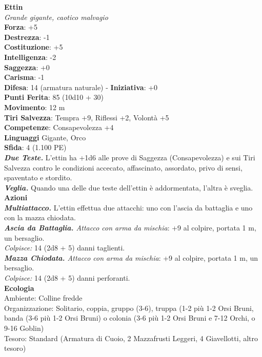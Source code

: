 \begin{multicols}{2}
\medskip\textbf{Ettin}\\
\emph{Grande gigante, caotico malvagio}\\
\textbf{Forza}: +5\\
\textbf{Destrezza}: -1\\
\textbf{Costituzione}: +5\\
\textbf{Intelligenza}: -2\\
\textbf{Saggezza}: +0\\
\textbf{Carisma}: -1\\
\textbf{Difesa}: 14 (armatura naturale) - \textbf{Iniziativa}: +0\\
\textbf{Punti Ferita}: 85 (10d10 + 30)\\
\textbf{Movimento}: 12 m\\
\textbf{Tiri Salvezza}: Tempra +9, Riflessi +2, Volontà +5\\
\textbf{Competenze}: Consapevolezza +4\\
\textbf{Linguaggi} Gigante, Orco\\
\textbf{Sfida}: 4 (1.100 PE)\smallskip\\
\emph{\textbf{Due Teste.}} L'ettin ha +1d6 alle prove di Saggezza (Consapevolezza) e sui Tiri Salvezza contro le condizioni accecato, affascinato, assordato, privo di sensi, spaventato e stordito. \\
\emph{\textbf{Veglia.}} Quando una delle due teste dell'ettin è addormentata, l'altra è sveglia.\\
\smallskip\textbf{Azioni} \\
\emph{\textbf{Multiattacco.}} L'ettin effettua due attacchi: uno con l'ascia da battaglia e uno con la mazza chiodata.\\
\emph{\textbf{Ascia da Battaglia.} Attacco con arma da mischia}: +9 al colpire, portata 1 m, un bersaglio.\\
\emph{Colpisce:} 14 (2d8 + 5) danni taglienti.\\
\emph{\textbf{Mazza Chiodata.} Attacco con arma da mischia}: +9 al colpire, portata 1 m, un bersaglio.\\
\emph{Colpisce:} 14 (2d8 + 5) danni perforanti.\\
\textbf{Ecologia}\\
Ambiente: Colline fredde\\
Organizzazione: Solitario, coppia, gruppo (3-6), truppa (1-2 più 1-2 Orsi Bruni, banda (3-6 più 1-2 Orsi Bruni) o colonia (3-6 più 1-2 Orsi Bruni e 7-12 Orchi, o 9-16 Goblin)\\
Tesoro: Standard (Armatura di Cuoio, 2 Mazzafrusti Leggeri, 4 Giavellotti, altro tesoro)\\

\end{multicols}
